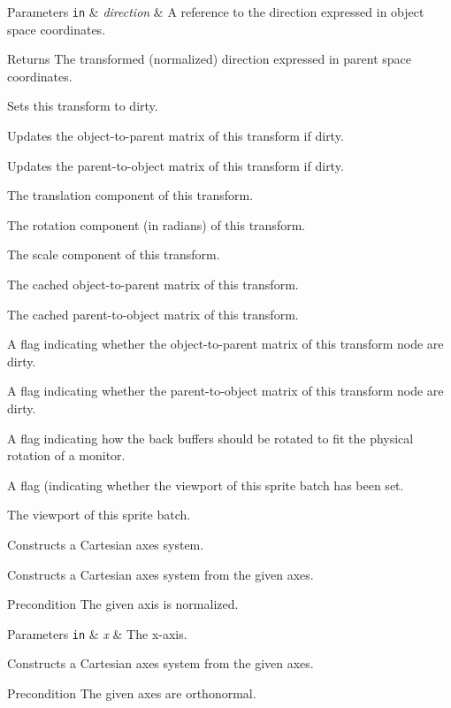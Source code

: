 \begin{DoxyParams}[1]{Parameters}
\mbox{\tt in}  & {\em direction} & A reference to the direction expressed in object space coordinates. \\
\hline
\end{DoxyParams}
\begin{DoxyReturn}{Returns}
The transformed (normalized) direction expressed in parent space coordinates.
\end{DoxyReturn}
Sets this transform to dirty.

Updates the object-\/to-\/parent matrix of this transform if dirty.

Updates the parent-\/to-\/object matrix of this transform if dirty.

The translation component of this transform.

The rotation component (in radians) of this transform.

The scale component of this transform.

The cached object-\/to-\/parent matrix of this transform.

The cached parent-\/to-\/object matrix of this transform.

A flag indicating whether the object-\/to-\/parent matrix of this transform node are dirty.

A flag indicating whether the parent-\/to-\/object matrix of this transform node are dirty.

A flag indicating how the back buffers should be rotated to fit the physical rotation of a monitor.

A flag (indicating whether the viewport of this sprite batch has been set.

The viewport of this sprite batch.

Constructs a Cartesian axes system.

Constructs a Cartesian axes system from the given axes.

\begin{DoxyPrecond}{Precondition}
The given axis is normalized. 
\end{DoxyPrecond}

\begin{DoxyParams}[1]{Parameters}
\mbox{\tt in}  & {\em x} & The x-\/axis.\\
\hline
\end{DoxyParams}
Constructs a Cartesian axes system from the given axes.

\begin{DoxyPrecond}{Precondition}
The given axes are orthonormal. 
\end{DoxyPrecond}

